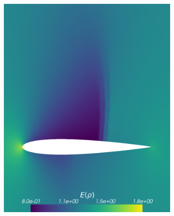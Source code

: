 \begin{figure}[h!]
\centering
	\begin{subfigure}{0.329\linewidth}
		\centering
		\includegraphics[width=\linewidth]{figs/Euler1DPlots5/EulerSC5-2Res1e-6_ERho.png}
		\label{fig:sub1}
	\end{subfigure}%
	\hfill
	\begin{subfigure}{0.329\linewidth}
		\centering

\end{subfigure}
\end{figure}
